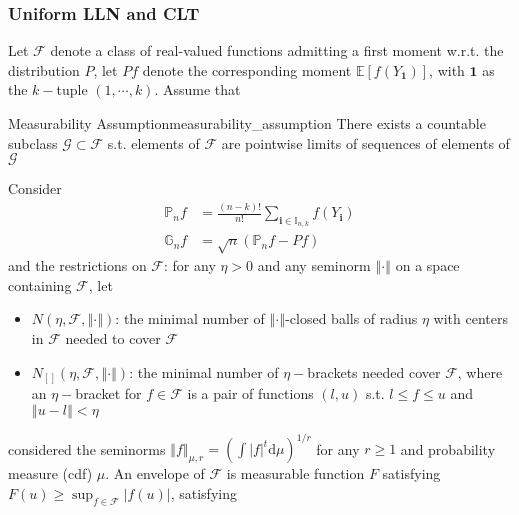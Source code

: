 \documentclass[twoside]{article}
\begin{document}
\subsubsection{Uniform LLN and CLT}
Let $\mathcal{F}$ denote a class of real-valued functions admitting a first moment w.r.t. the distribution $P$, let $Pf$ denote the corresponding moment $\mathbb{E}\left[f(Y_{\mathbf{1}})\right]$, with $\mathbf{1}$ as the $k-$tuple $(1,\cdots,k)$. Assume that
\begin{assumption}{Measurability Assumption}{measurability_assumption}
    There exists a countable subclass $\mathcal{G}\subset \mathcal{F}$ s.t. elements of $\mathcal{F}$ are pointwise limits of sequences of elements of $\mathcal{G}$
\end{assumption}
Consider
\begin{align*}
    \mathbb{P}_n f &= \frac{(n-k)!}{n!} \sum_{\mathbf{i}\in \mathbb{I}_{n,k}}f(Y_{\mathbf{i}}) \\
    \mathbb{G}_n f &= \sqrt{n}\left(\mathbb{P}_n f - Pf\right)
\end{align*}
and the restrictions on $\mathcal{F}$: for any $\eta>0$ and any seminorm $\left\Vert \cdot \right\Vert$ on a space containing $\mathcal{F}$, let
\begin{itemize}
    \item $N\left(\eta, \mathcal{F}, \left\Vert \cdot \right\Vert\right)$: the minimal number of $\left\Vert \cdot \right\Vert$-closed balls of radius $\eta$ with centers in $\mathcal{F}$ needed to cover $\mathcal{F}$
    \item $N_{[]}\left(\eta, \mathcal{F}, \left\Vert \cdot \right\Vert\right)$: the minimal number of $\eta-$brackets needed cover $\mathcal{F}$, where an $\eta-$bracket for $f\in\mathcal{F}$ is a pair of functions $\left(l,u\right)$ s.t. $l\leq f\leq u$ and $\left\Vert u-l \right\Vert<\eta$
\end{itemize}
\citet{davezies2021empirical} considered the seminorms $\left\Vert f \right\Vert _{\mu,r}=\left(\int \left\vert f \right\vert^t \mathrm{d}\mu\right)^{1/r}$ for any $r\geq 1$ and probability measure (cdf) $\mu$. An envelope of $\mathcal{F}$ is measurable function $F$ satisfying $F(u) \geq \sup_{f\in\mathcal{F}}\left\vert f(u) \right\vert$, satisfying 
\end{document}
